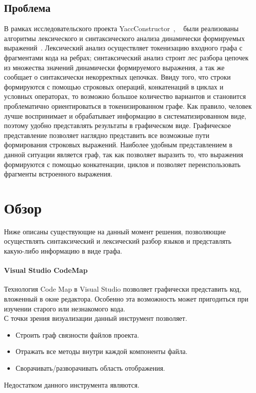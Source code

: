 \documentclass{matmex-diploma}
\begin{document}
\subsection*{Проблема}
В рамках исследовательского проекта YaccConstructor~\cite{wiki:YC}, ~\cite{wiki:YCPap} были реализованы алгоритмы лексического и синтаксического анализа динамически формируемых выражений~\cite{book:expression}. Лексический анализ осуществляет токенизацию входного графа с фрагментами кода на ребрах; синтаксический анализ строит лес разбора цепочек из множества значений динамически формируемого выражения, а так же сообщает о синтаксически некорректных цепочках. Ввиду того, что строки формируются с помощью строковых операций, конкатенаций в циклах и условных операторах, то возможно большое количество вариантов и становится проблематично ориентироваться в токенизированном графе. Как правило, человек лучше воспринимает и обрабатывает информацию в систематизированном виде, поэтому удобно представлять результаты в графическом виде. Графическое представление позволяет наглядно представить все возможные пути формирования строковых выражений. Наиболее удобным представлением в данной ситуации является граф, так как позволяет выразить то, что выражения формируются с помощью конкатенации, циклов и позволяет переиспользовать фрагменты встроенного выражения.

\section{Обзор}
Ниже описаны существующие на данный момент решения, позволяющие осуществлять синтаксический и лексический разбор языков и представлять какую-либо информацию в виде графа.
\paragraph {Visual Studio CodeMap}
Технология Code Map в Visual Studio позволяет графически представить код, вложенный в окне редактора. Особенно эта возможность может пригодиться при изучении старого или незнакомого кода. \\
С точки зрения визуализации данный инструмент позволяет.

\begin{itemize}

        \item { Строить граф связности файлов проекта. }
        \item { Отражать все методы внутри каждой компоненты файла. }
        \item { Сворачивать/разворачивать область отображения. }
        
 \end{itemize}
Недостатком данного инструмента являются.
\end{document}
